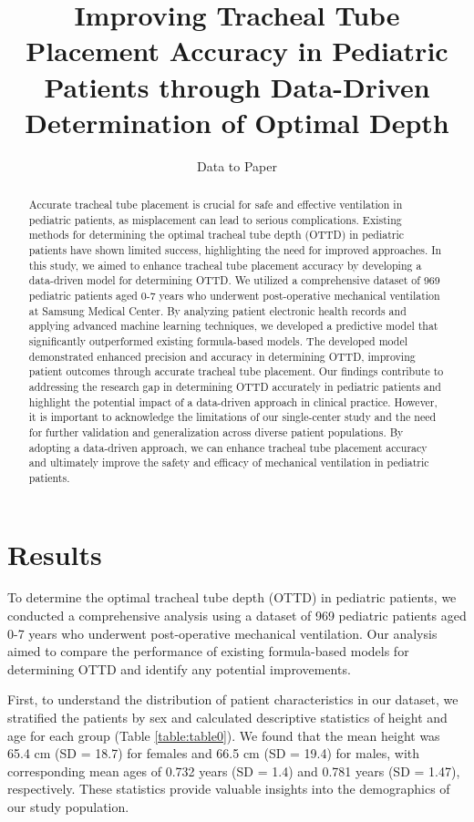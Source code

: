 \documentclass[11pt]{article}
\title{Improving Tracheal Tube Placement Accuracy in Pediatric Patients through Data-Driven Determination of Optimal Depth}
\author{Data to Paper}
\begin{document}
\maketitle
\begin{abstract}
Accurate tracheal tube placement is crucial for safe and effective ventilation in pediatric patients, as misplacement can lead to serious complications. Existing methods for determining the optimal tracheal tube depth (OTTD) in pediatric patients have shown limited success, highlighting the need for improved approaches. In this study, we aimed to enhance tracheal tube placement accuracy by developing a data-driven model for determining OTTD. We utilized a comprehensive dataset of 969 pediatric patients aged 0-7 years who underwent post-operative mechanical ventilation at Samsung Medical Center. By analyzing patient electronic health records and applying advanced machine learning techniques, we developed a predictive model that significantly outperformed existing formula-based models. The developed model demonstrated enhanced precision and accuracy in determining OTTD, improving patient outcomes through accurate tracheal tube placement. Our findings contribute to addressing the research gap in determining OTTD accurately in pediatric patients and highlight the potential impact of a data-driven approach in clinical practice. However, it is important to acknowledge the limitations of our single-center study and the need for further validation and generalization across diverse patient populations. By adopting a data-driven approach, we can enhance tracheal tube placement accuracy and ultimately improve the safety and efficacy of mechanical ventilation in pediatric patients.
\end{abstract}
\section*{Results}

To determine the optimal tracheal tube depth (OTTD) in pediatric patients, we conducted a comprehensive analysis using a dataset of 969 pediatric patients aged 0-7 years who underwent post-operative mechanical ventilation. Our analysis aimed to compare the performance of existing formula-based models for determining OTTD and identify any potential improvements. 

First, to understand the distribution of patient characteristics in our dataset, we stratified the patients by sex and calculated descriptive statistics of height and age for each group (Table {}\ref{table:table0}). We found that the mean height was 65.4 cm (SD = 18.7) for females and 66.5 cm (SD = 19.4) for males, with corresponding mean ages of 0.732 years (SD = 1.4) and 0.781 years (SD = 1.47), respectively. These statistics provide valuable insights into the demographics of our study population.
\end{document}
